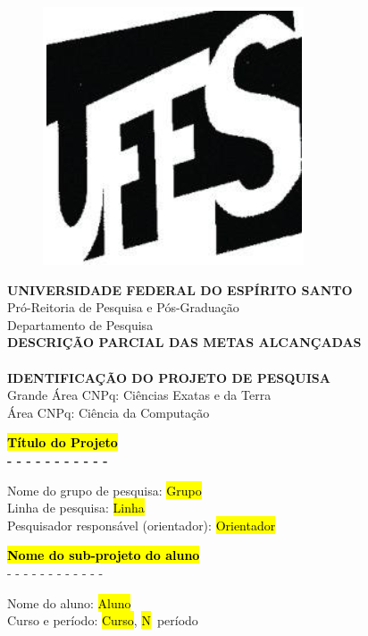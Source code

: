 \documentclass[10pt, a4paper]{article}
\begin{document}
\begin{center}
	\begin{figure}[h!]
	\centering
	\includegraphics[scale=0.5]{figuras/ufes}
	\end{figure}

	{\bf \Large UNIVERSIDADE FEDERAL DO ESPÍRITO SANTO}\\
	Pró-Reitoria de Pesquisa e Pós-Graduação\\
	Departamento de Pesquisa\\
	{\bf \Large DESCRIÇÃO PARCIAL DAS METAS ALCANÇADAS}\\
	\ \\
	{\bf \Large IDENTIFICAÇÃO DO PROJETO DE PESQUISA}\\
	Grande Área CNPq: Ciências Exatas e da Terra \\
	Área CNPq: Ciência da Computação
	
	\vspace{1cm}
	
	{\bf \Large \hl{Título do Projeto}}\\
	{\bf  - - - - - - - - - - -}
\end{center}
%
Nome do grupo de pesquisa: \hl{Grupo} \\
Linha de pesquisa: \hl{Linha} \\
Pesquisador responsável (orientador): \hl{Orientador}

\vspace{1.5cm}

\begin{center}
	{\bf \Large \hl{Nome do sub-projeto do aluno}}\\
	{- - - - - - - - - - - - }
\end{center}
%
Nome do aluno: \hl{Aluno} \\
Curso e período: \hl{Curso}, \hl{N}\textordmasculine\ período
\end{document}
